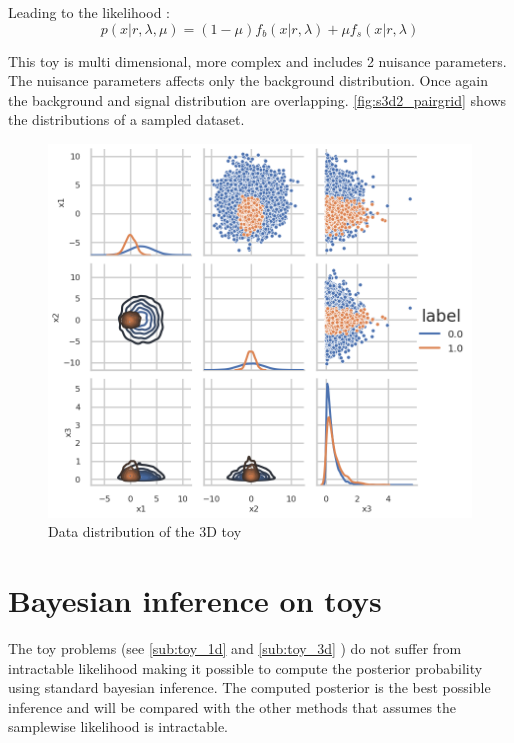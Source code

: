 Leading to the likelihood :
\begin{equation}
	p(x | r, \lambda, \mu ) = (1-\mu) f_b(x|r, \lambda) + \mu f_s(x|r, \lambda)
\end{equation}

This toy is multi dimensional, more complex and includes 2 nuisance parameters.
The nuisance parameters affects only the background distribution.
Once again the background and signal distribution are overlapping.
\autoref{fig:s3d2_pairgrid} shows the distributions of a sampled dataset.

\begin{figure}[htb]
    \includegraphics[width=\linewidth]{s3d2/pairgrid}
    \caption{Data distribution of the 3D toy}
    \label{fig:s3d2_pairgrid}
\end{figure}






\section{Bayesian inference on toys} %
\label{sec:bayesian_inference_on_toys}


The toy problems (see \autoref{sub:toy_1d} and \autoref{sub:toy_3d} ) do not suffer from intractable likelihood making it possible to compute the posterior probability using standard bayesian inference.
The computed posterior is the best possible inference and will be compared with the other methods that assumes the samplewise likelihood is intractable.

